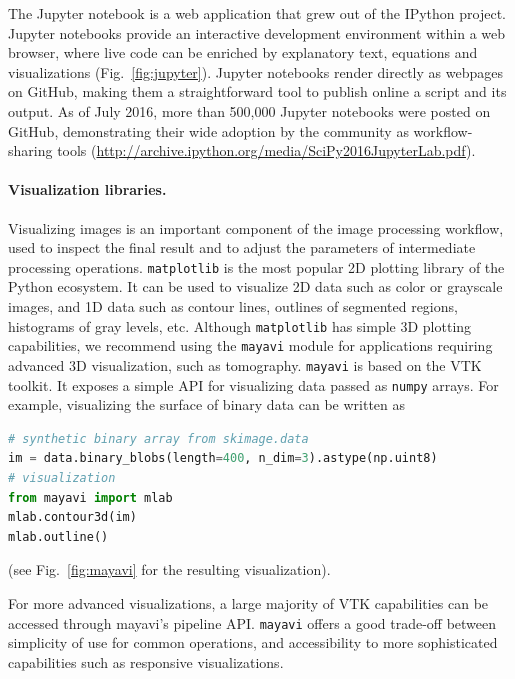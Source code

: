\documentclass[twocolumn]{bmcart}%
\begin{document}
The Jupyter notebook \citep{Kluyver2016} is a web application that grew
out of the IPython project. Jupyter notebooks provide an interactive
development environment within a web browser, where live code can be
enriched by explanatory text, equations and visualizations
(Fig.~\ref{fig:jupyter}). Jupyter notebooks render directly as webpages
on GitHub, making them a straightforward tool to publish online a
script and its output. As of July 2016, more than 500,000 Jupyter
notebooks were posted on GitHub, demonstrating their wide adoption by the
community as workflow-sharing tools
(\url{http://archive.ipython.org/media/SciPy2016JupyterLab.pdf}).


\paragraph{Visualization libraries.}


Visualizing images is an important component of the image processing
workflow, used to inspect the final result and to adjust the
parameters of intermediate processing operations.
\texttt{matplotlib} \citep{Hunter2007} is the most popular 2D plotting
library of the Python ecosystem. It can be used to visualize 2D data such
as color or grayscale images, and 1D data such as contour lines, outlines
of segmented regions, histograms of gray levels, etc. Although
\texttt{matplotlib} has simple 3D plotting capabilities, we
recommend using the \texttt{mayavi} module \citep{Ramachandran2011}
for applications requiring advanced 3D visualization, such as tomography. 
\texttt{mayavi} is based on the VTK toolkit. It exposes a simple API for
visualizing data passed as \texttt{numpy} arrays. For example,
visualizing the surface of binary data can be written as
\begin{lstlisting}[language=Python]
# synthetic binary array from skimage.data
im = data.binary_blobs(length=400, n_dim=3).astype(np.uint8)
# visualization
from mayavi import mlab
mlab.contour3d(im)
mlab.outline()
\end{lstlisting}
(see Fig.~\ref{fig:mayavi} for the resulting visualization).

For more advanced visualizations, a large majority of VTK capabilities
can be accessed through mayavi's pipeline API. \texttt{mayavi} offers a
good trade-off between simplicity of use for common operations, and
accessibility to more sophisticated capabilities such as responsive
visualizations.
\end{document}
